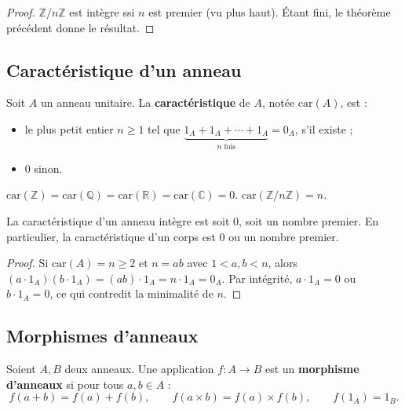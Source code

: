 \begin{proof}
$\mathbb{Z}/n\mathbb{Z}$ est intègre ssi $n$ est premier (vu plus haut). Étant fini, le théorème précédent donne le résultat.
\end{proof}

\subsection{Caractéristique d'un anneau}

\begin{definition}[Caractéristique]
Soit $A$ un anneau unitaire. La \textbf{caractéristique} de $A$, notée $\mathrm{car}(A)$, est :
\begin{itemize}
    \item le plus petit entier $n \ge 1$ tel que $\underbrace{1_A + 1_A + \cdots + 1_A}_{n \text{ fois}} = 0_A$, s'il existe ;
    \item $0$ sinon.
\end{itemize}
\end{definition}

\begin{exemple}
$\mathrm{car}(\mathbb{Z}) = \mathrm{car}(\mathbb{Q}) = \mathrm{car}(\mathbb{R}) = \mathrm{car}(\mathbb{C}) = 0$.
$\mathrm{car}(\mathbb{Z}/n\mathbb{Z}) = n$.
\end{exemple}

\begin{proposition}
La caractéristique d'un anneau intègre est soit $0$, soit un nombre premier. En particulier, la caractéristique d'un corps est $0$ ou un nombre premier.
\end{proposition}

\begin{proof}
Si $\mathrm{car}(A) = n \ge 2$ et $n = ab$ avec $1 < a, b < n$, alors $(a \cdot 1_A)(b \cdot 1_A) = (ab) \cdot 1_A = n \cdot 1_A = 0_A$. Par intégrité, $a \cdot 1_A = 0$ ou $b \cdot 1_A = 0$, ce qui contredit la minimalité de $n$.
\end{proof}

\subsection{Morphismes d'anneaux}

\begin{definition}
Soient $A, B$ deux anneaux. Une application $f : A \to B$ est un \textbf{morphisme d'anneaux} si pour tous $a, b \in A$ :
\[ f(a + b) = f(a) + f(b), \qquad f(a \times b) = f(a) \times f(b), \qquad f(1_A) = 1_B. \]
\end{definition}

